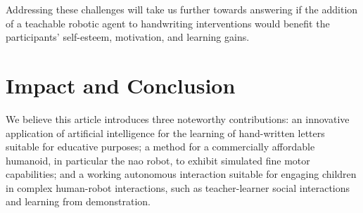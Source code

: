 \documentclass{sig-alternate}
\begin{document}
Addressing these challenges will take us further towards answering if 
the addition of a teachable robotic agent to handwriting interventions 
would benefit the participants' self-esteem, motivation, and learning gains.


%

%


\addtolength{\textheight}{-11.2cm}   %

\section{Impact and Conclusion}\label{sec:conclusions}

We believe this article introduces three noteworthy contributions: an 
innovative application of artificial intelligence for the learning of 
hand-written letters suitable for educative purposes; a method for a 
commercially affordable humanoid, in particular the {\sc nao} robot, to exhibit
simulated fine motor capabilities; and a working autonomous interaction 
suitable for engaging children in complex human-robot interactions, such as 
teacher-learner social interactions and learning from demonstration.
\end{document}
